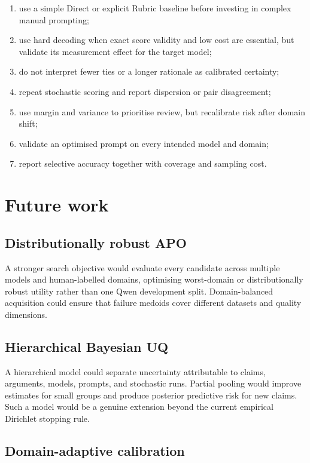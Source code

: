 \documentclass[11pt,twoside,a4paper]{report}
\begin{document}
\begin{enumerate}
  \item use a simple Direct or explicit Rubric baseline before investing in complex
  manual prompting;
  \item use hard decoding when exact score validity and low cost are essential, but
  validate its measurement effect for the target model;
  \item do not interpret fewer ties or a longer rationale as calibrated certainty;
  \item repeat stochastic scoring and report dispersion or pair disagreement;
  \item use margin and variance to prioritise review, but recalibrate risk after
  domain shift;
  \item validate an optimised prompt on every intended model and domain;
  \item report selective accuracy together with coverage and sampling cost.
\end{enumerate}

\section{Future work}

\subsection{Distributionally robust APO}

A stronger search objective would evaluate every candidate across multiple models
and human-labelled domains, optimising worst-domain or distributionally robust
utility rather than one Qwen development split.  Domain-balanced acquisition could
ensure that failure medoids cover different datasets and quality dimensions.

\subsection{Hierarchical Bayesian UQ}

A hierarchical model could separate uncertainty attributable to claims, arguments,
models, prompts, and stochastic runs.  Partial pooling would improve estimates for
small groups and produce posterior predictive risk for new claims.  Such a model
would be a genuine extension beyond the current empirical Dirichlet stopping rule.

\subsection{Domain-adaptive calibration}
\end{document}

